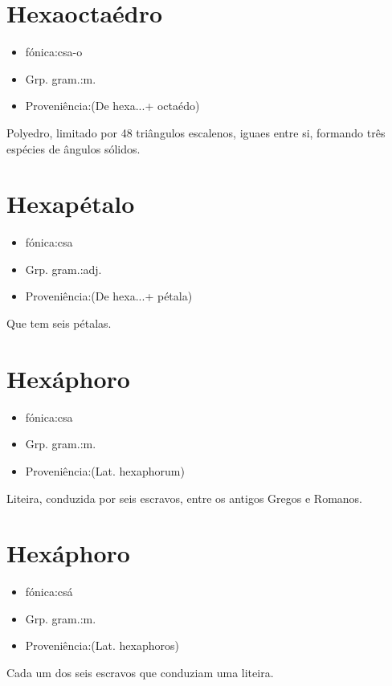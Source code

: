 \documentclass{article}
\begin{document}
\section{Hexaoctaédro}
\begin{itemize}
\item {fónica:csa-o}
\end{itemize}
\begin{itemize}
\item {Grp. gram.:m.}
\end{itemize}
\begin{itemize}
\item {Proveniência:(De \textunderscore hexa...\textunderscore  + \textunderscore octaédo\textunderscore )}
\end{itemize}
Polyedro, limitado por 48 triângulos escalenos, iguaes entre si, formando três espécies de ângulos sólidos.
\section{Hexapétalo}
\begin{itemize}
\item {fónica:csa}
\end{itemize}
\begin{itemize}
\item {Grp. gram.:adj.}
\end{itemize}
\begin{itemize}
\item {Proveniência:(De \textunderscore hexa...\textunderscore  + \textunderscore pétala\textunderscore )}
\end{itemize}
Que tem seis pétalas.
\section{Hexáphoro}
\begin{itemize}
\item {fónica:csa}
\end{itemize}
\begin{itemize}
\item {Grp. gram.:m.}
\end{itemize}
\begin{itemize}
\item {Proveniência:(Lat. \textunderscore hexaphorum\textunderscore )}
\end{itemize}
Liteira, conduzida por seis escravos, entre os antigos Gregos e Romanos.
\section{Hexáphoro}
\begin{itemize}
\item {fónica:csá}
\end{itemize}
\begin{itemize}
\item {Grp. gram.:m.}
\end{itemize}
\begin{itemize}
\item {Proveniência:(Lat. \textunderscore hexaphoros\textunderscore )}
\end{itemize}
Cada um dos seis escravos que conduziam uma liteira.
\end{document}
